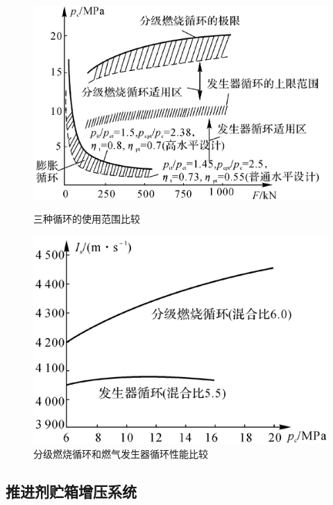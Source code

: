 \begin{figure}[!htb]
	\centering
	\begin{minipage}{0.49\linewidth}
		\centering
		\includegraphics[width=\linewidth]{pic/三循环使用范围.png}
		\caption{三种循环的使用范围比较}
	\end{minipage}
	\begin{minipage}{0.49\linewidth}
		\centering
		\includegraphics[width=0.935\linewidth]{pic/分级与燃气.png}
		\caption{分级燃烧循环和燃气发生器循环性能比较}
	\end{minipage}
\end{figure}


\subsection{推进剂贮箱增压系统}

\sssection[推进剂贮箱增压系统功能及分类]

